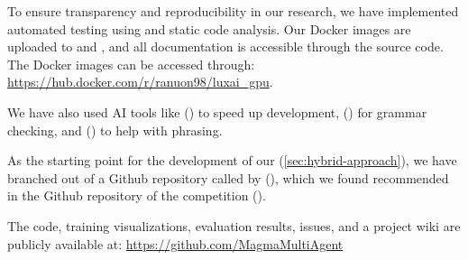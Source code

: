 \bigskip

\noindent To ensure transparency and reproducibility in our research, we have implemented automated testing using  and static code analysis. Our Docker images are uploaded to  and , and all documentation is accessible through the source code. The Docker images can be accessed through: \url{https://hub.docker.com/r/ranuon98/luxai_gpu}.

\bigskip

\noindent We have also used AI tools like  (\textcolor{deepblue}{\cite{github-copilot}}) to speed up development,  (\textcolor{deepblue}{\cite{Grammarly}}) for grammar checking, and  (\textcolor{deepblue}{\cite{chatgpt}}) to help with phrasing.

\bigskip

\noindent As the starting point for the development of our  (\autoref{sec:hybrid-approach}), we have branched out of a Github repository called  by  (\cite{luxai_s2-baseline-source}), which we found recommended in the Github repository of the  competition (\cite{luxais2_neurips_23}).

\bigskip

\noindent The code, training visualizations, evaluation results, issues, and a project wiki are publicly available at: \url{https://github.com/MagmaMultiAgent}
